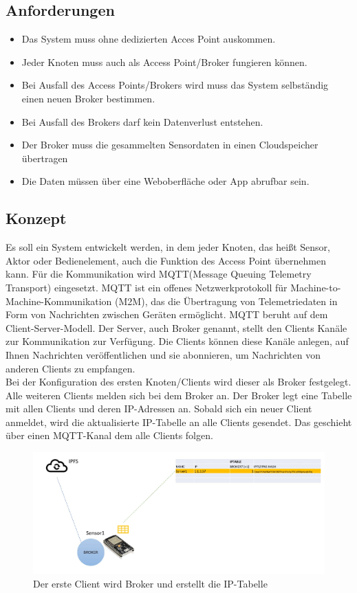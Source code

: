 \documentclass{article}
\begin{document}
\subsection{Anforderungen}
\begin{itemize}
    \item Das System muss ohne dedizierten Acces Point auskommen.
    \item Jeder Knoten muss auch als Access Point/Broker fungieren können.
    \item Bei Ausfall des Access Points/Brokers wird muss das System selbständig einen neuen Broker bestimmen.
    \item Bei Ausfall des Brokers darf kein Datenverlust entstehen.
    \item Der Broker muss die gesammelten Sensordaten in einen Cloudspeicher übertragen
    \item Die Daten müssen über eine Weboberfläche oder App abrufbar sein.

\end{itemize}
\subsection{Konzept}
Es soll ein System entwickelt werden, in dem jeder Knoten, das heißt Sensor, Aktor oder Bedienelement, auch die Funktion des Access Point übernehmen kann. Für die Kommunikation wird MQTT(Message Queuing Telemetry Transport) eingesetzt. MQTT ist ein offenes Netzwerkprotokoll für Machine-to-Machine-Kommunikation (M2M), das die Übertragung von Telemetriedaten in Form von Nachrichten zwischen Geräten ermöglicht.
MQTT beruht auf dem Client-Server-Modell. Der Server, auch Broker genannt, stellt den Clients Kanäle zur Kommunikation zur Verfügung. Die Clients können diese Kanäle anlegen, auf Ihnen Nachrichten veröffentlichen und sie abonnieren, um Nachrichten von anderen Clients zu empfangen. 
\\

Bei der Konfiguration des ersten Knoten/Clients wird dieser als Broker festgelegt. Alle weiteren Clients melden sich bei dem Broker an. Der Broker legt eine Tabelle mit allen Clients und deren IP-Adressen an. Sobald sich ein neuer Client anmeldet, wird die aktualisierte IP-Tabelle an alle Clients gesendet. Das geschieht über einen MQTT-Kanal dem alle Clients folgen.

\begin{figure}[h]
    \centering
    \includegraphics[width=1\linewidth]{Porposal/Bilder/bild1.jpg}
    \caption{Der erste Client wird Broker und erstellt die IP-Tabelle}
    \label{fig:statemachine}
\end{figure}
\end{document}
